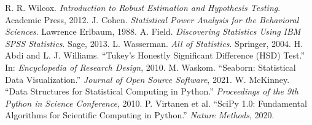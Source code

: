 \begin{thebibliography}{9}
 R. R. Wilcox. \textit{Introduction to Robust Estimation and Hypothesis Testing}. Academic Press, 2012.
 J. Cohen. \textit{Statistical Power Analysis for the Behavioral Sciences}. Lawrence Erlbaum, 1988.
 A. Field. \textit{Discovering Statistics Using IBM SPSS Statistics}. Sage, 2013.
 L. Wasserman. \textit{All of Statistics}. Springer, 2004.
 H. Abdi and L. J. Williams. “Tukey’s Honestly Significant Difference (HSD) Test.” In: \textit{Encyclopedia of Research Design}, 2010.
 M. Waskom. “Seaborn: Statistical Data Visualization.” \textit{Journal of Open Source Software}, 2021.
 W. McKinney. “Data Structures for Statistical Computing in Python.” \textit{Proceedings of the 9th Python in Science Conference}, 2010.
 P. Virtanen et al. “SciPy 1.0: Fundamental Algorithms for Scientific Computing in Python.” \textit{Nature Methods}, 2020.
\end{thebibliography}
